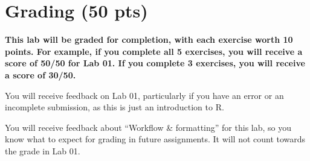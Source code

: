 \documentclass[
]{article}
\begin{document}
\section{Grading (50 pts)}\label{grading-50-pts}

\textbf{This lab will be graded for completion, with each exercise worth
10 points. For example, if you complete all 5 exercises, you will
receive a score of 50/50 for Lab 01. If you complete 3 exercises, you
will receive a score of 30/50.}

You will receive feedback on Lab 01, particularly if you have an error
or an incomplete submission, as this is just an introduction to R.

You will receive feedback about ``Workflow \& formatting'' for this lab,
so you know what to expect for grading in future assignments. It will
not count towards the grade in Lab 01.
\end{document}
